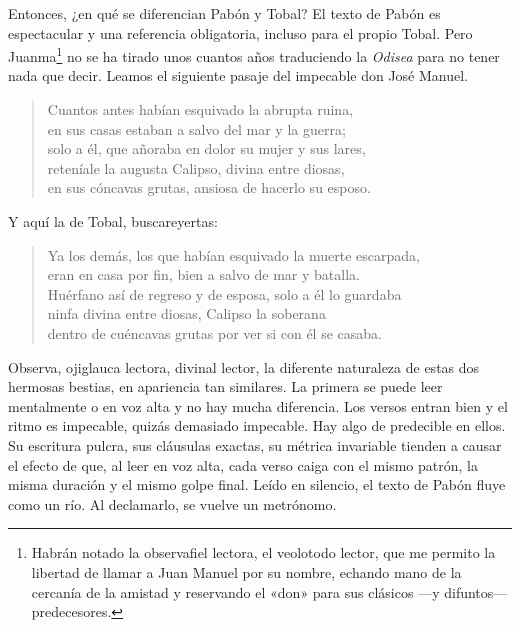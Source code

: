Entonces, ¿en qué se diferencian Pabón y Tobal? 
%
El texto de Pabón es espectacular y una referencia obligatoria, incluso para el propio Tobal. Pero Juanma\footnote{Habrán notado la observafiel lectora, el veolotodo lector, que me permito la libertad de llamar a Juan Manuel por su nombre, echando mano de la cercanía de la amistad y reservando el «don» para sus clásicos ---y difuntos--- predecesores.} no se ha tirado unos cuantos años traduciendo la \emph{Odisea} para no tener nada que decir. Leamos el siguiente pasaje del impecable don José Manuel.

\begin{verse}
Cuantos antes habían esquivado la abrupta ruina,\\
en sus casas estaban a salvo del mar y la guerra;\\
solo a él, que añoraba en dolor su mujer y sus lares,\\
reteníale la augusta Calipso, divina entre diosas,\\
en sus cóncavas grutas, ansiosa de hacerlo su esposo. 
\end{verse}

Y aquí la de Tobal, buscareyertas: 

\begin{verse}
Ya los demás, los que habían esquivado la muerte escarpada,\\
eran en casa por fin, bien a salvo de mar y batalla.\\
Huérfano así de regreso y de esposa, solo a él lo guardaba\\
ninfa divina entre diosas, Calipso la soberana\\
dentro de cuéncavas grutas por ver si con él se casaba. 
\end{verse}

Observa, ojiglauca lectora, divinal lector, la diferente naturaleza de estas dos hermosas bestias, en apariencia tan similares. La primera se puede leer mentalmente o en voz alta y no hay mucha diferencia. Los versos entran bien y el ritmo es impecable, quizás demasiado impecable. Hay algo de predecible en ellos. Su escritura pulcra, sus cláusulas exactas, su métrica invariable tienden a causar el efecto de que, al leer en voz alta, cada verso caiga con el mismo patrón, la misma duración y el mismo golpe final. Leído en silencio, el texto de Pabón fluye como un río. Al declamarlo, se vuelve un metrónomo. 

